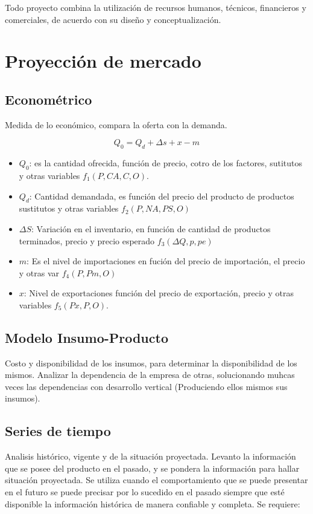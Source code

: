 \documentclass[a4paper, 11pt, oneside]{article}
\begin{document}
Todo proyecto combina la utilización de recursos humanos, técnicos, financieros y comerciales,
de acuerdo con su diseño y conceptualización.

\section{Proyección de mercado}

\subsection{Econométrico}
Medida de lo económico, compara la oferta con la demanda.

\[Q_0 = Q_d + \Delta s + x - m \]

\begin{itemize}
	\item $Q_0$: es la cantidad ofrecida, función de precio, cotro de los factores, sutitutos y otras variables $f_1(P,CA,C,O)$.
	\item $Q_d$: Cantidad demandada, es función del precio del producto de productos sustitutos y otras variables $f_2(P,NA,PS,O)$
	\item $\Delta S$: Variación en el inventario, en función de cantidad de productos terminados, precio y precio esperado $f_3(\Delta Q, p, pe)$
	\item $m$: Es el nivel de importaciones en fución del precio de importación, el precio y otras var $f_4(P, Pm, O)$
	\item $x$: Nivel de exportaciones función del precio de exportación, precio y otras variables $f_5(Px,P,O)$.
\end{itemize}

\subsection{Modelo Insumo-Producto}
Costo y disponibilidad de los insumos, para determinar la disponibilidad de los mismos. Analizar la dependencia
de la empresa de otras, solucionando muhcas veces las dependencias con desarrollo vertical (Produciendo ellos
mismos sus insumos).

\subsection{Series de tiempo}
Analisis histórico, vigente y de la situación proyectada. Levanto la información que se posee del producto en el
pasado, y se pondera la información para hallar situación proyectada. Se utiliza cuando el comportamiento que se puede
presentar en el futuro se puede precisar por lo sucedido en el pasado siempre que esté disponible la información histórica
de manera confiable y completa. Se requiere:
\end{document}
